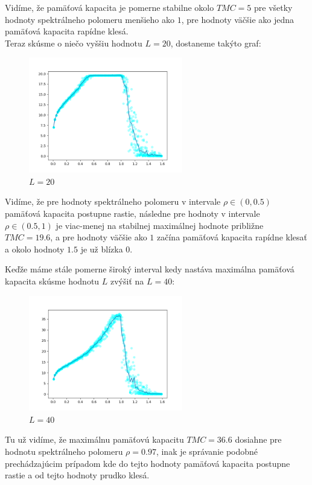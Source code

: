 \documentclass[a4paper]{article}
\begin{document}
	Vidíme, že pamäťová kapacita je pomerne stabilne okolo $TMC=5$ pre všetky hodnoty spektrálneho polomeru menšieho ako $1$, pre hodnoty väčšie ako jedna pamäťová kapacita rapídne klesá. 
	\\
	
	Teraz skúsme o niečo vyššiu hodnotu $L=20$, dostaneme takýto graf:
	
	\begin{figure}[!h]
		\centering
		\includegraphics[width=0.6\textwidth]{../L_20.png}
		\caption{$L=20$}
	\end{figure}

	Vidíme, že pre hodnoty spektrálneho polomeru v intervale $\rho \in (0, 0.5)$ pamäťová kapacita postupne rastie, následne pre hodnoty v intervale $\rho \in(0.5, 1)$ je viac-menej na stabilnej maximálnej hodnote približne $TMC=19.6$, a pre hodnoty väčšie ako $1$ začína pamäťová kapacita rapídne klesať a okolo hodnoty $1.5$ je už blízka $0$.
	\newpage
	
	Keďže máme stále pomerne široký interval kedy nastáva maximálna pamäťová kapacita skúsme hodnotu $L$ zvýšiť na $L=40$:
	
	\begin{figure}[!h]
		\centering
		\includegraphics[width=0.6\textwidth]{../L_40.png}
		\caption{$L=40$}
	\end{figure}

	Tu už vidíme, že maximálnu pamäťovú kapacitu $TMC=36.6$ dosiahne pre hodnotu spektrálneho polomeru $\rho=0.97$, inak je správanie podobné prechádzajúcim prípadom kde do tejto hodnoty pamäťová kapacita postupne rastie a od tejto hodnoty prudko klesá.
	\\
	
\end{document}
